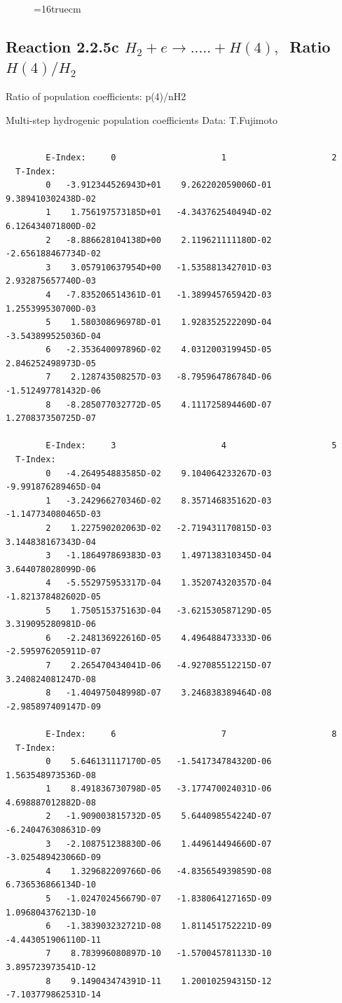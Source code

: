 \documentclass[12pt,dvips]{article}
\begin{document}
\begin{figure} \label{2.2.5b}
\epsfxsize=16truecm
\end{figure}
\newpage

\subsection{
Reaction 2.2.5c  $H_2 + e \rightarrow .....+H(4)   , \  $
Ratio $H(4)/H_2 $
}

 Ratio of population coefficients: p(4)/nH2

 Multi-step hydrogenic population coefficients
 Data: T.Fujimoto

\begin{small}\begin{verbatim}

        E-Index:     0                     1                     2
  T-Index:
        0   -3.912344526943D+01    9.262202059006D-01    9.389410302438D-02
        1    1.756197573185D+01   -4.343762540494D-02    6.126434071800D-02
        2   -8.886628104138D+00    2.119621111180D-02   -2.656188467734D-02
        3    3.057910637954D+00   -1.535881342701D-03    2.932875657740D-03
        4   -7.835206514361D-01   -1.389945765942D-03    1.255399530700D-03
        5    1.580308696978D-01    1.928352522209D-04   -3.543899525036D-04
        6   -2.353640097896D-02    4.031200319945D-05    2.846252498973D-05
        7    2.128743508257D-03   -8.795964786784D-06   -1.512497781432D-06
        8   -8.285077032772D-05    4.111725894460D-07    1.270837350725D-07

        E-Index:     3                     4                     5
  T-Index:
        0   -4.264954883585D-02    9.104064233267D-03   -9.991876289465D-04
        1   -3.242966270346D-02    8.357146835162D-03   -1.147734080465D-03
        2    1.227590202063D-02   -2.719431170815D-03    3.144838167343D-04
        3   -1.186497869383D-03    1.497138310345D-04    3.644078028099D-06
        4   -5.552975953317D-04    1.352074320357D-04   -1.821378482602D-05
        5    1.750515375163D-04   -3.621530587129D-05    3.319095280981D-06
        6   -2.248136922616D-05    4.496488473333D-06   -2.595976205911D-07
        7    2.265470434041D-06   -4.927085512215D-07    3.240824081247D-08
        8   -1.404975048998D-07    3.246838389464D-08   -2.985897409147D-09

        E-Index:     6                     7                     8
  T-Index:
        0    5.646131117170D-05   -1.541734784320D-06    1.563548973536D-08
        1    8.491836730798D-05   -3.177470024031D-06    4.698887012882D-08
        2   -1.909003815732D-05    5.644098554224D-07   -6.240476308631D-09
        3   -2.108751238830D-06    1.449614494660D-07   -3.025489423066D-09
        4    1.329682209766D-06   -4.835654939859D-08    6.736536866134D-10
        5   -1.024702456679D-07   -1.838064127165D-09    1.096804376213D-10
        6   -1.383903232721D-08    1.811451752221D-09   -4.443051906110D-11
        7    8.783996080897D-10   -1.570045781133D-10    3.895723973541D-12
        8    9.149043474391D-11    1.200102594315D-12   -7.103779862531D-14


\end{verbatim}
\end{small}
\end{document}
